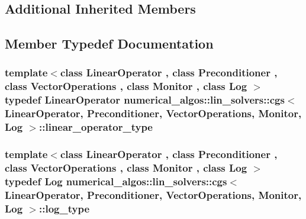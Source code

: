 \subsection*{Additional Inherited Members}


\subsection{Member Typedef Documentation}
\hypertarget{classnumerical__algos_1_1lin__solvers_1_1cgs_a9aa9a945e8f133f9ef15f83a7a7880dc}{
\subsubsection[{linear\-\_\-operator\-\_\-type}]{\setlength{\rightskip}{0pt plus 5cm}template$<$class Linear\-Operator , class Preconditioner , class Vector\-Operations , class Monitor , class Log $>$ typedef Linear\-Operator {\bf numerical\-\_\-algos\-::lin\-\_\-solvers\-::cgs}$<$ Linear\-Operator, Preconditioner, Vector\-Operations, Monitor, Log $>$\-::{\bf linear\-\_\-operator\-\_\-type}}}\label{classnumerical__algos_1_1lin__solvers_1_1cgs_a9aa9a945e8f133f9ef15f83a7a7880dc}
\hypertarget{classnumerical__algos_1_1lin__solvers_1_1cgs_af876166d874a6f33d2d626817605618f}{
\subsubsection[{log\-\_\-type}]{\setlength{\rightskip}{0pt plus 5cm}template$<$class Linear\-Operator , class Preconditioner , class Vector\-Operations , class Monitor , class Log $>$ typedef Log {\bf numerical\-\_\-algos\-::lin\-\_\-solvers\-::cgs}$<$ Linear\-Operator, Preconditioner, Vector\-Operations, Monitor, Log $>$\-::{\bf log\-\_\-type}}}\label{classnumerical__algos_1_1lin__solvers_1_1cgs_af876166d874a6f33d2d626817605618f}
